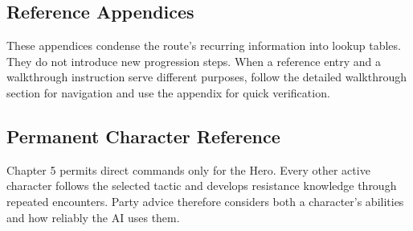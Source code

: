 \documentclass[
  american,
  10pt,
  letterpaper,
  oneside,
  open=any]{scrreprt}
\newenvironment{guidetable}{%
  \small\setstretch{1.0}%
  \setlength{\tabcolsep}{4pt}%
  \setlength{\LTpre}{8pt}\setlength{\LTpost}{10pt}%
  \renewcommand{\arraystretch}{1.16}%
}{ }
\begin{document}
\begin{landscape}

\chapter{Reference Appendices}\label{reference-appendices}

These appendices condense the route's recurring information into lookup
tables. They do not introduce new progression steps. When a reference
entry and a walkthrough instruction serve different purposes, follow the
detailed walkthrough section for navigation and use the appendix for
quick verification.

\section{Permanent Character
Reference}\label{permanent-character-reference}

Chapter 5 permits direct commands only for the Hero. Every other active
character follows the selected tactic and develops resistance knowledge
through repeated encounters. Party advice therefore considers both a
character's abilities and how reliably the AI uses them.

\begin{guidetable}


\end{guidetable}
\end{landscape}
\end{document}
